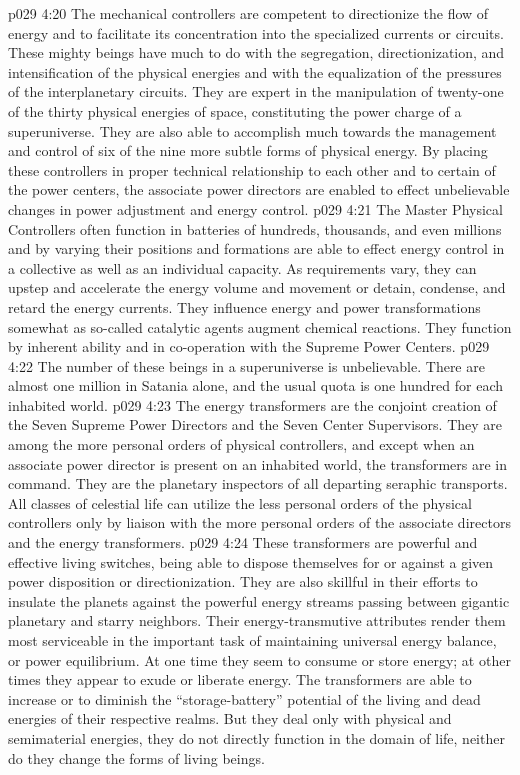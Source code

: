 \vs p029 4:20 The mechanical controllers are competent to directionize the flow of energy and to facilitate its concentration into the specialized currents or circuits. These mighty beings have much to do with the segregation, directionization, and intensification of the physical energies and with the equalization of the pressures of the interplanetary circuits. They are expert in the manipulation of twenty\hyp{}one of the thirty physical energies of space, constituting the power charge of a superuniverse. They are also able to accomplish much towards the management and control of six of the nine more subtle forms of physical energy. By placing these controllers in proper technical relationship to each other and to certain of the power centers, the associate power directors are enabled to effect unbelievable changes in power adjustment and energy control.
\vs p029 4:21 The Master Physical Controllers often function in batteries of hundreds, thousands, and even millions and by varying their positions and formations are able to effect energy control in a collective as well as an individual capacity. As requirements vary, they can upstep and accelerate the energy volume and movement or detain, condense, and retard the energy currents. They influence energy and power transformations somewhat as so\hyp{}called catalytic agents augment chemical reactions. They function by inherent ability and in co\hyp{}operation with the Supreme Power Centers.
\pc \vs p029 4:22 \bibnobreakspace {} The number of these beings in a superuniverse is unbelievable. There are almost one million in Satania alone, and the usual quota is one hundred for each inhabited world.
\vs p029 4:23 The energy transformers are the conjoint creation of the Seven Supreme Power Directors and the Seven Center Supervisors. They are among the more personal orders of physical controllers, and except when an associate power director is present on an inhabited world, the transformers are in command. They are the planetary inspectors of all departing seraphic transports. All classes of celestial life can utilize the less personal orders of the physical controllers only by liaison with the more personal orders of the associate directors and the energy transformers.
\vs p029 4:24 These transformers are powerful and effective living switches, being able to dispose themselves for or against a given power disposition or directionization. They are also skillful in their efforts to insulate the planets against the powerful energy streams passing between gigantic planetary and starry neighbors. Their energy\hyp{}transmutive attributes render them most serviceable in the important task of maintaining universal energy balance, or power equilibrium. At one time they seem to consume or store energy; at other times they appear to exude or liberate energy. The transformers are able to increase or to diminish the “storage\hyp{}battery” potential of the living and dead energies of their respective realms. But they deal only with physical and semimaterial energies, they do not directly function in the domain of life, neither do they change the forms of living beings.
